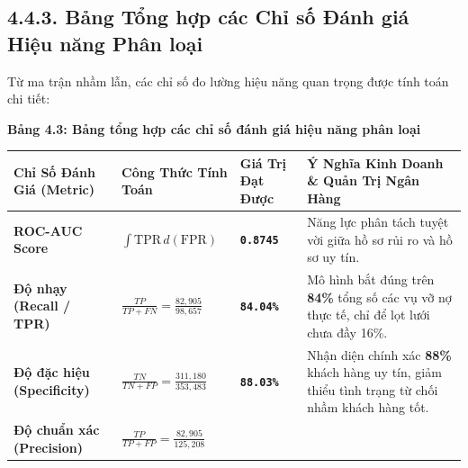 \documentclass[
  13pt,
  a4paper,
]{report}
\newcounter{none} %
\begin{document}
\subsection{4.4.3. Bảng Tổng hợp các Chỉ số Đánh giá Hiệu năng Phân
loại}\label{bux1ea3ng-tux1ed5ng-hux1ee3p-cuxe1c-chux1ec9-sux1ed1-ux111uxe1nh-giuxe1-hiux1ec7u-nux103ng-phuxe2n-loux1ea1i}

Từ ma trận nhầm lẫn, các chỉ số đo lường hiệu năng quan trọng được tính
toán chi tiết:

\textbf{Bảng 4.3: Bảng tổng hợp các chỉ số đánh giá hiệu năng phân loại}

{\def\LTcaptype{none} %
\begin{longtable}[]{@{}
  >{\raggedright\arraybackslash}p{}
  >{\centering\arraybackslash}p{}
  >{\centering\arraybackslash}p{}
  >{\raggedright\arraybackslash}p{}@{}}
\toprule\noalign{}
\begin{minipage}[b]{\linewidth}\raggedright
Chỉ Số Đánh Giá (Metric)
\end{minipage} & \begin{minipage}[b]{\linewidth}\centering
Công Thức Tính Toán
\end{minipage} & \begin{minipage}[b]{\linewidth}\centering
Giá Trị Đạt Được
\end{minipage} & \begin{minipage}[b]{\linewidth}\raggedright
Ý Nghĩa Kinh Doanh \& Quản Trị Ngân Hàng
\end{minipage} \\
\midrule\noalign{}
\endhead
\bottomrule\noalign{}
\endlastfoot
\textbf{ROC-AUC Score} & \(\int \text{TPR} \, d(\text{FPR})\) &
\textbf{\texttt{0.8745}} & Năng lực phân tách tuyệt vời giữa hồ sơ rủi
ro và hồ sơ uy tín. \\
\textbf{Độ nhạy (Recall / TPR)} &
\(\frac{TP}{TP + FN} = \frac{82,905}{98,657}\) &
\textbf{\texttt{84.04\%}} & Mô hình bắt đúng trên \textbf{84\%} tổng số
các vụ vỡ nợ thực tế, chỉ để lọt lưới chưa đầy 16\%. \\
\textbf{Độ đặc hiệu (Specificity)} &
\(\frac{TN}{TN + FP} = \frac{311,180}{353,483}\) &
\textbf{\texttt{88.03\%}} & Nhận diện chính xác \textbf{88\%} khách hàng
uy tín, giảm thiểu tình trạng từ chối nhầm khách hàng tốt. \\
\textbf{Độ chuẩn xác (Precision)} &
\(\frac{TP}{TP + FP} = \frac{82,905}{125,208}\) &

\end{longtable}}
\end{document}
